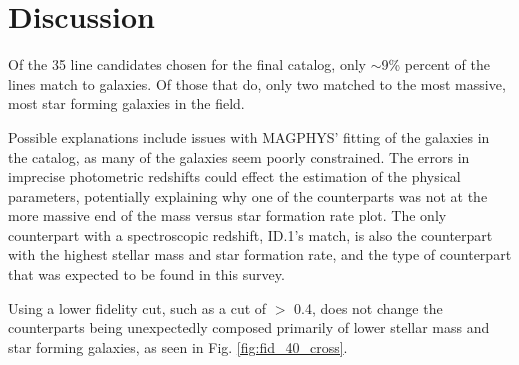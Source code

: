 
\section{Discussion}

Of the 35 line candidates chosen for the final catalog, only $\sim$9\% percent of the lines match to galaxies. Of those that do, only two matched to the most massive, most star forming galaxies in the field.


Possible explanations include issues with MAGPHYS' fitting of the galaxies in the catalog, as many of the galaxies seem poorly constrained. The errors in imprecise photometric redshifts could effect the estimation of the physical parameters, potentially explaining why one of the counterparts was not at the more massive end of the mass versus star formation rate plot. The only counterpart with a spectroscopic redshift, ID.1's match, is also the counterpart with the highest stellar mass and star formation rate, and the type of counterpart that was expected to be found in this survey.

Using a lower fidelity cut, such as a cut of $>$ 0.4, does not change the counterparts being unexpectedly composed primarily of lower stellar mass and star forming galaxies, as seen in Fig. \ref{fig:fid_40_cross}. 


